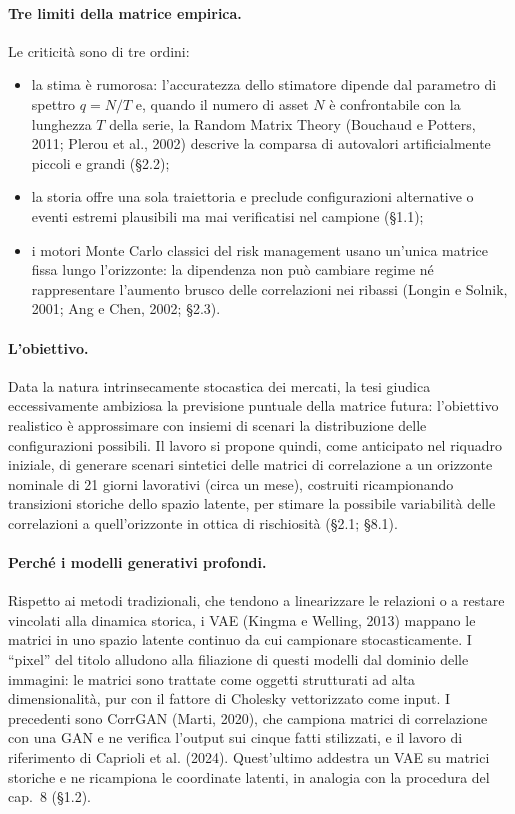 \paragraph{Tre limiti della matrice empirica.} Le criticità sono di tre ordini:
\begin{itemize}
\item la stima è rumorosa: l'accuratezza dello stimatore dipende dal parametro di spettro $q = N/T$ e, quando il numero di asset $N$ è confrontabile con la lunghezza $T$ della serie, la Random Matrix Theory (Bouchaud e Potters, 2011; Plerou et al., 2002) descrive la comparsa di autovalori artificialmente piccoli e grandi (\S2.2);
\item la storia offre una sola traiettoria e preclude configurazioni alternative o eventi estremi plausibili ma mai verificatisi nel campione (\S1.1);
\item i motori Monte Carlo classici del risk management usano un'unica matrice fissa lungo l'orizzonte: la dipendenza non può cambiare regime né rappresentare l'aumento brusco delle correlazioni nei ribassi (Longin e Solnik, 2001; Ang e Chen, 2002; \S2.3).
\end{itemize}

\paragraph{L'obiettivo.} Data la natura intrinsecamente stocastica dei mercati, la tesi giudica eccessivamente ambiziosa la previsione puntuale della matrice futura: l'obiettivo realistico è approssimare con insiemi di scenari la distribuzione delle configurazioni possibili. Il lavoro si propone quindi, come anticipato nel riquadro iniziale, di generare scenari sintetici delle matrici di correlazione a un orizzonte nominale di 21 giorni lavorativi (circa un mese), costruiti ricampionando transizioni storiche dello spazio latente, per stimare la possibile variabilità delle correlazioni a quell'orizzonte in ottica di rischiosità (\S2.1; \S8.1).

\paragraph{Perché i modelli generativi profondi.} Rispetto ai metodi tradizionali, che tendono a linearizzare le relazioni o a restare vincolati alla dinamica storica, i VAE (Kingma e Welling, 2013) mappano le matrici in uno spazio latente continuo da cui campionare stocasticamente. I ``pixel'' del titolo alludono alla filiazione di questi modelli dal dominio delle immagini: le matrici sono trattate come oggetti strutturati ad alta dimensionalità, pur con il fattore di Cholesky vettorizzato come input. I precedenti sono CorrGAN (Marti, 2020), che campiona matrici di correlazione con una GAN e ne verifica l'output sui cinque fatti stilizzati, e il lavoro di riferimento di Caprioli et al. (2024). Quest'ultimo addestra un VAE su matrici storiche e ne ricampiona le coordinate latenti, in analogia con la procedura del cap.~8 (\S1.2).

